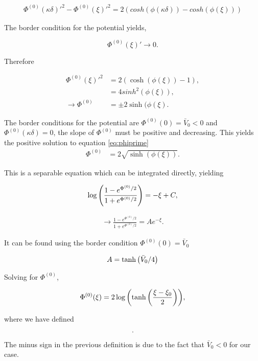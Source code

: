 \begin{align}
\Phi^{(0)}(\kappa \delta)'^2  -\Phi^{(0)}(\xi)'^2   = 2(cosh(\phi(\kappa \delta))-cosh(\phi(\xi)))
\end{align}

The border condition for the potential yields, 

$$\Phi^{(0)}(\xi)' \rightarrow 0.$$

Therefore

\begin{align}
\Phi^{(0)}(\xi)'^2   &= 2(\cosh(\phi(\xi))-1),\\
&= 4sinh^2(\phi(\xi)), \\
\rightarrow \Phi^{(0)} &= \pm 2\sinh(\phi(\xi).
\label{eq:phiprime}
\end{align}


The border conditions for the potential are $\Phi^{(0)}(0) = \bar{V}_0<0$ and $\Phi^{(0)}(\kappa \delta) = 0$, the slope of $\Phi^{(0)}$ must be positive and decreasing. This yields the positive solution to equation \ref{eq:phiprime}
\begin{align}
\Phi^{(0)} &=  2\sqrt{\sinh(\phi(\xi))}.
\end{align}

This is a separable equation which can be integrated directly, yielding

\begin{align}
	\log\left({\frac{1-e^{\Phi^{(0)}/2}}{1+e^{\Phi^{(0)}/2}}}\right) = -\xi + C,
\end{align}

\begin{align}
	\rightarrow \frac{1-e^{\Phi^{(0)}/2}}{1+e^{\Phi^{(0)}/2}}= Ae^{-\xi}.
\end{align}

It can be found using the border condition $\Phi^{(0)}(0) = \bar{V}_0$

\begin{align}
A = \tanh\left({{\bar{V}_0/4}}\right)
\end{align}

Solving for $\Phi^{(0)}$,

\begin{align}
\Phi^{(0)}(\xi) =  2\log{ \left({\tanh \left({\frac{\xi-\xi_0}{2}}\right) }\right) },
\label{eq:pot0}
\end{align}

where we have defined

$$.$$

The minus sign in the previous definition is due to the fact that $\bar{V}_0 < 0$ for our case.




